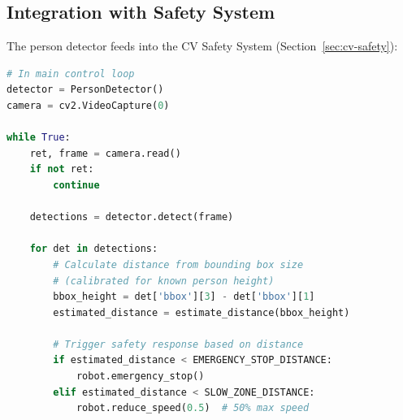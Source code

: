 \subsection{Integration with Safety System}

The person detector feeds into the CV Safety System (Section~\ref{sec:cv-safety}):

\begin{lstlisting}[language=Python, caption=Integration with safety pipeline]
# In main control loop
detector = PersonDetector()
camera = cv2.VideoCapture(0)

while True:
    ret, frame = camera.read()
    if not ret:
        continue

    detections = detector.detect(frame)

    for det in detections:
        # Calculate distance from bounding box size
        # (calibrated for known person height)
        bbox_height = det['bbox'][3] - det['bbox'][1]
        estimated_distance = estimate_distance(bbox_height)

        # Trigger safety response based on distance
        if estimated_distance < EMERGENCY_STOP_DISTANCE:
            robot.emergency_stop()
        elif estimated_distance < SLOW_ZONE_DISTANCE:
            robot.reduce_speed(0.5)  # 50% max speed
\end{lstlisting}
